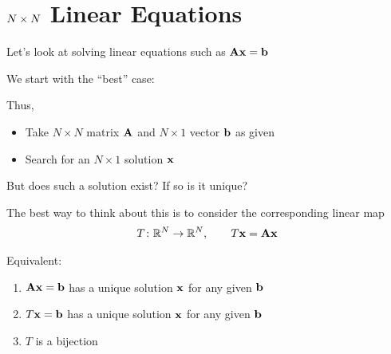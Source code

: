 \documentclass[letterpaper,10pt,english]{jupyterBook}
\begin{document}
\section{\protect\(N \times N\protect\) Linear Equations}
\label{\detokenize{05.linear_algebra:n-times-n-linear-equations}}
\sphinxAtStartPar
Let’s look at solving linear equations such as \({\bf A} {\bf x} = {\bf b}\)

\sphinxAtStartPar
We start with the “best” case:  

\sphinxAtStartPar
Thus,
\begin{itemize}
\item {} 
\sphinxAtStartPar
Take \(N \times N\) matrix \({\bf A}\) and \(N \times 1\) vector \({\bf b}\) as given

\item {} 
\sphinxAtStartPar
Search for an \(N \times 1\) solution \({\bf x}\)

\end{itemize}

\sphinxAtStartPar
But does such a solution exist? If so is it unique?

\sphinxAtStartPar
The best way to think about this is to consider
the corresponding linear map
\begin{equation*}
\begin{split}
%
T \colon \mathbb{R}^N \to \mathbb{R}^N,
\qquad T{\bf x} = {\bf A} {\bf x}
%
\end{split}
\end{equation*}
\begin{figure}[htbp]
\centering

\noindent{}
\end{figure}

\sphinxAtStartPar
Equivalent:
\begin{enumerate}
%
\item {} 
\sphinxAtStartPar
\({\bf A} {\bf x} = {\bf b}\) has a unique solution \({\bf x}\) for any
given \({\bf b}\)

\item {} 
\sphinxAtStartPar
\(T {\bf x} = {\bf b}\) has a unique solution \({\bf x}\) for any
given \({\bf b}\)

\item {} 
\sphinxAtStartPar
\(T\) is a bijection

\end{enumerate}
\end{document}
